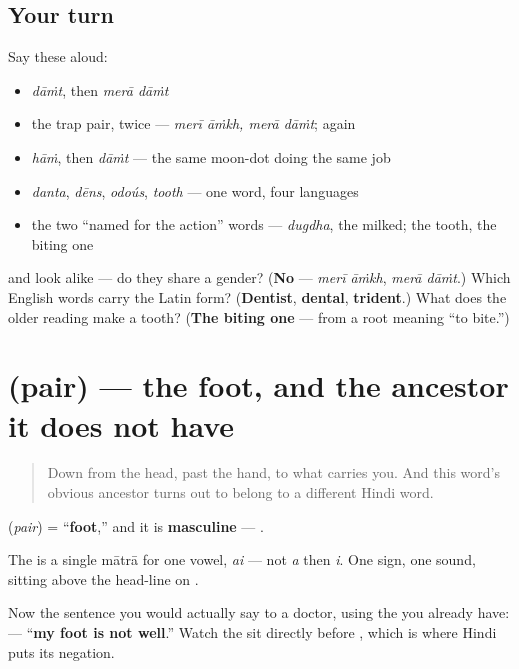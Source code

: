 \subsection*{Your turn}
Say these aloud:

\begin{itemize}
\raggedright
  \item \emph{dāṁt}, then \emph{merā dāṁt}
  \item the trap pair, twice — \emph{merī āṁkh, merā dāṁt}; again
  \item \emph{hāṁ}, then \emph{dāṁt} — the same moon-dot doing the same job
  \item \emph{danta}, \emph{dēns}, \emph{odoús}, \emph{tooth} — one word, four languages
  \item the two \textquotedblleft{}named for the action\textquotedblright{} words — \emph{dugdha}, the milked; the tooth, the biting one
\end{itemize}

\begin{tcolorbox}[breakable,colback=teal!4,colframe=teal!35!black,title={Before you move on}]
\textbf{} and \textbf{} look alike — do they share a gender? (\textbf{No} — \emph{merī āṁkh}, \emph{merā dāṁt}.) Which English words carry the Latin form? (\textbf{Dentist}, \textbf{dental}, \textbf{trident}.) What does the older reading make a tooth? (\textbf{The biting one} — from a root meaning \textquotedblleft{}to bite.\textquotedblright{})
\end{tcolorbox}
\section[\texorpdfstring{\hi{पैर} / \hi{पाँव} (pair / pāṁv)}{पैर / पाँव (pair / pāṁv)}]{ (pair) — the foot, and the ancestor it does not have}

\label{lesson:HI-C38-pair}



\begin{quote}
Down from the head, past the hand, to what carries you. And this word's obvious ancestor turns out to belong to a different Hindi word.
\end{quote}

\begin{grammarlens}[title={Grammar Lens: masculine, and the sentence that uses it}]
\textbf{} (\emph{pair}) = \textquotedblleft{}\textbf{foot},\textquotedblright{} and it is \textbf{masculine} — \textbf{ }.

The \textbf{} is a single mātrā for one vowel, \emph{ai} — not \emph{a} then \emph{i}. One sign, one sound, sitting above the head-line on \textbf{}.

Now the sentence you would actually say to a doctor, using the \textbf{} you already have: \textbf{    } — \textquotedblleft{}\textbf{my foot is not well}.\textquotedblright{} Watch the \textbf{} sit directly before \textbf{}, which is where Hindi puts its negation.
\end{grammarlens}

